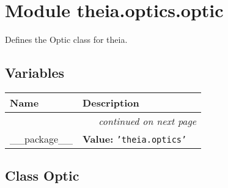 %
%
%


\section{Module theia.optics.optic}

    \label{theia:optics:optic}
Defines the Optic class for theia.



  \subsection{Variables}

    \vspace{-1cm}
\hspace{\varindent}\begin{longtable}{|p{\varnamewidth}|p{\vardescrwidth}|l}
\cline{1-2}
\cline{1-2} \centering \textbf{Name} & \centering \textbf{Description}& \\
\cline{1-2}
\endhead\cline{1-2}\multicolumn{3}{r}{\small\textit{continued on next page}}\\\endfoot\cline{1-2}
\endlastfoot\raggedright \_\-\_\-p\-a\-c\-k\-a\-g\-e\-\_\-\_\- & \raggedright \textbf{Value:} 
{\tt \texttt{'}\texttt{theia.optics}\texttt{'}}&\\
\cline{1-2}
\end{longtable}



\subsection{Class Optic}

